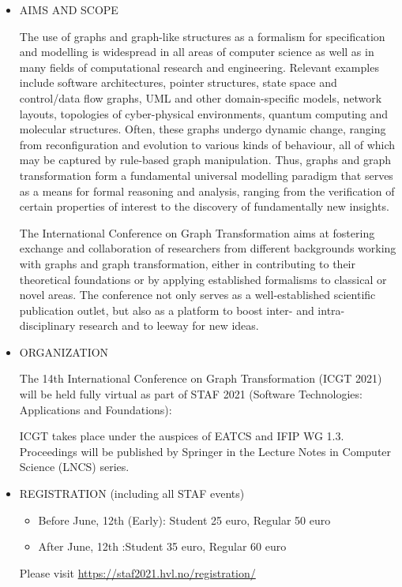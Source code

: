 \documentclass[prodmode,acmtecs]{acmsmall} %
\begin{document}
\begin{itemize}\item  AIMS AND SCOPE 
 
  The use of graphs and graph-like structures as a formalism for specification and modelling is widespread in all areas of computer science as well as in many fields of computational research and engineering. Relevant examples include software architectures, pointer structures, state space and control/data flow graphs, UML and other domain-specific models, network layouts, topologies of cyber-physical environments, quantum computing and molecular structures. Often, these graphs undergo dynamic change, ranging from reconfiguration and evolution to various kinds of behaviour, all of which may be captured by rule-based graph manipulation. Thus, graphs and graph transformation form a fundamental universal modelling paradigm that serves as a means for formal reasoning and analysis, ranging from the verification of certain properties of interest to the discovery of fundamentally new insights. 
 
  The International Conference on Graph Transformation aims at fostering exchange and collaboration of researchers from different backgrounds working with graphs and graph transformation, either in contributing to their theoretical foundations or by applying established formalisms to classical or novel areas. The conference not only serves as a well-established scientific publication outlet, but also as a platform to boost inter- and intra-disciplinary research and to leeway for new ideas. 
 
\item  ORGANIZATION 
 
  The 14th International Conference on Graph Transformation (ICGT 2021) will be held fully virtual as part of STAF 2021 (Software Technologies: Applications and Foundations): 
 
  ICGT takes place under the auspices of EATCS and IFIP WG 1.3. Proceedings will be published by Springer in the Lecture Notes in Computer Science (LNCS) series. 
 
\item  REGISTRATION (including all STAF events) 
 
\begin{itemize}\item  Before June, 12th (Early): Student 25 euro, Regular 50 euro
\item  After June, 12th :Student 35 euro, Regular 60 euro
\end{itemize} 
  Please visit \href{https://staf2021.hvl.no/registration/}{https://staf2021.hvl.no/registration/} 
 

\end{itemize}
\end{document}
